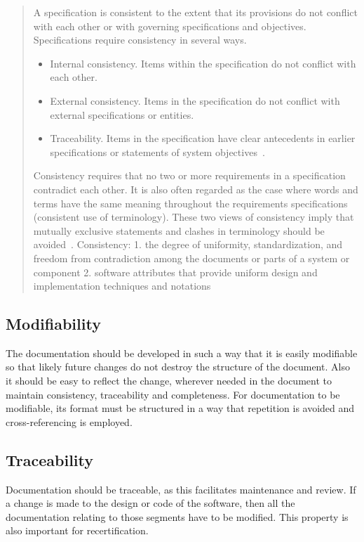 \documentclass[letterpaper,cleveref]{lipics-v2019}
\begin{document}
\begin{quotation}
    A specification is consistent to the extent that its provisions do not conflict with each other or with governing specifications and objectives. Specifications require consistency in several ways.
    \begin{itemize}
        \item Internal consistency. Items within the specification do not conflict with each other.
        \item External consistency. Items in the specification do not conflict with external specifications or entities.
        \item Traceability. Items in the specification have clear antecedents in earlier specifications or statements of system objectives~\cite{Boehm1984}.
    \end{itemize}
    Consistency requires that no two or more requirements in a specification contradict each other. It is also often regarded as the case where words and terms have the same meaning throughout the requirements specifications (consistent use of terminology). These two views of consistency imply that mutually exclusive statements and clashes in terminology should be avoided~\cite{ZOWGHI2003}. Consistency: 1. the degree of uniformity, standardization, and freedom from contradiction among the documents or parts of a system or component 2. software attributes that provide uniform design and implementation techniques and notations~\cite{ISO/IEC/IEEE24765}
\end{quotation}

\subsection{Modifiability}

The documentation should be developed in such a way that it is easily modifiable
so that likely future changes do not destroy the structure of the document. Also
it should be easy to reflect the change, wherever needed in the document to
maintain consistency, traceability and completeness. For documentation to be
modifiable, its format must be structured in a way that repetition is avoided
and cross-referencing is employed.

\subsection{Traceability}

Documentation should be traceable, as this facilitates maintenance and
review. If a change is made to the design or code of the software, then all the
documentation relating to those segments have to be modified.  This property is
also important for recertification.
\end{document}
